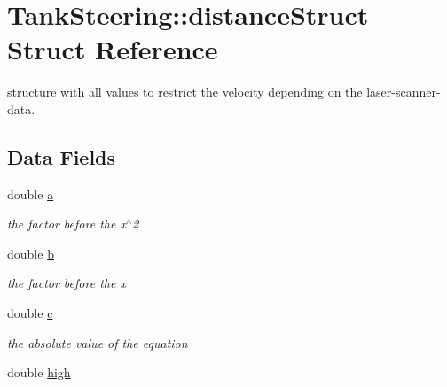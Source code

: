 \hypertarget{structTankSteering_1_1distanceStruct}{\section{Tank\-Steering\-:\-:distance\-Struct Struct Reference}
\label{structTankSteering_1_1distanceStruct}
}


structure with all values to restrict the velocity depending on the laser-\/scanner-\/data.  


\subsection*{Data Fields}
\begin{DoxyCompactItemize}
\item 
\hypertarget{structTankSteering_1_1distanceStruct_a3d27444d897b76c5fd31b3562938ec50}{double \hyperlink{structTankSteering_1_1distanceStruct_a3d27444d897b76c5fd31b3562938ec50}{a}}\label{structTankSteering_1_1distanceStruct_a3d27444d897b76c5fd31b3562938ec50}

\begin{DoxyCompactList}\small\item\em the factor before the x$^\wedge$2 \end{DoxyCompactList}\item 
\hypertarget{structTankSteering_1_1distanceStruct_a5fab2689bfcfa0c34b03c9e5adfc540f}{double \hyperlink{structTankSteering_1_1distanceStruct_a5fab2689bfcfa0c34b03c9e5adfc540f}{b}}\label{structTankSteering_1_1distanceStruct_a5fab2689bfcfa0c34b03c9e5adfc540f}

\begin{DoxyCompactList}\small\item\em the factor before the x \end{DoxyCompactList}\item 
\hypertarget{structTankSteering_1_1distanceStruct_a057147d8925b80f772f8e299067248a8}{double \hyperlink{structTankSteering_1_1distanceStruct_a057147d8925b80f772f8e299067248a8}{c}}\label{structTankSteering_1_1distanceStruct_a057147d8925b80f772f8e299067248a8}

\begin{DoxyCompactList}\small\item\em the absolute value of the equation \end{DoxyCompactList}\item 
\hypertarget{structTankSteering_1_1distanceStruct_a4c297988074a426bbfd0e489e450a9e4}{double \hyperlink{structTankSteering_1_1distanceStruct_a4c297988074a426bbfd0e489e450a9e4}{high}}\label{structTankSteering_1_1distanceStruct_a4c297988074a426bbfd0e489e450a9e4}


\end{DoxyCompactItemize}
